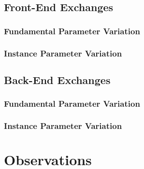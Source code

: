 \subsection{Front-End Exchanges}

\subsubsection{Fundamental Parameter Variation}

\subsubsection{Instance Parameter Variation}

\subsection{Back-End Exchanges}

\subsubsection{Fundamental Parameter Variation}

\subsubsection{Instance Parameter Variation}

\section{Observations}
